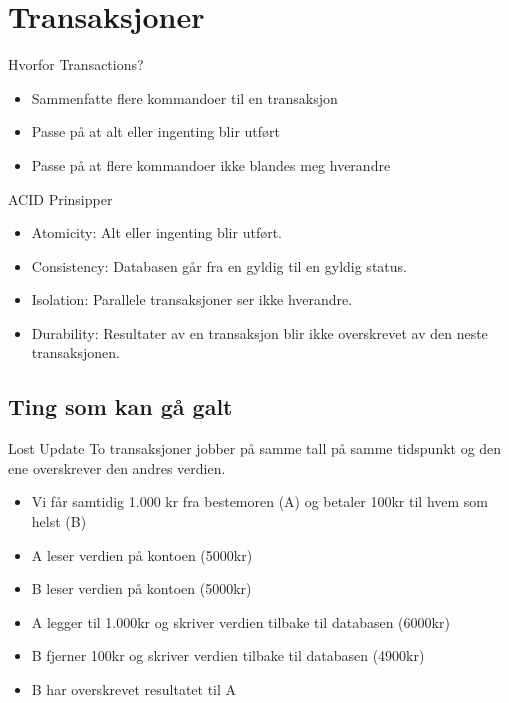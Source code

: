 \section{Transaksjoner}
\begin{frame}{Hvorfor Transactions?}
    \begin{itemize}[<+->]
        \item Sammenfatte flere kommandoer til en transaksjon
        \item Passe på at alt eller ingenting blir utført
        \item Passe på at flere kommandoer ikke blandes meg hverandre
    \end{itemize}
\end{frame}

\begin{frame}{ACID Prinsipper}
    \begin{itemize}[<+->]
        \item Atomicity: Alt eller ingenting blir utført.
        \item Consistency: Databasen går fra en gyldig til en gyldig status.
        \item Isolation: Parallele transaksjoner ser ikke hverandre.
        \item Durability: Resultater av en transaksjon blir ikke overskrevet av den neste transaksjonen.
    \end{itemize}
\end{frame}

\subsection*{Ting som kan gå galt}
\begin{frame}{}
    \begin{block}{Lost Update}
    To transaksjoner jobber på samme tall på samme tidspunkt og den ene overskrever den andres verdien.
    \end{block}
    \pause
    \begin{itemize}[<+->]
        \item Vi får samtidig 1.000 kr fra bestemoren (A) og betaler 100kr til hvem som helst (B)
        \item A leser verdien på kontoen (5000kr)
        \item B leser verdien på kontoen (5000kr)
        \item A legger til 1.000kr og skriver verdien tilbake til databasen (6000kr)
        \item B fjerner 100kr og skriver verdien tilbake til databasen (4900kr)
        \item B har overskrevet resultatet til A
    \end{itemize}
    
\end{frame}

